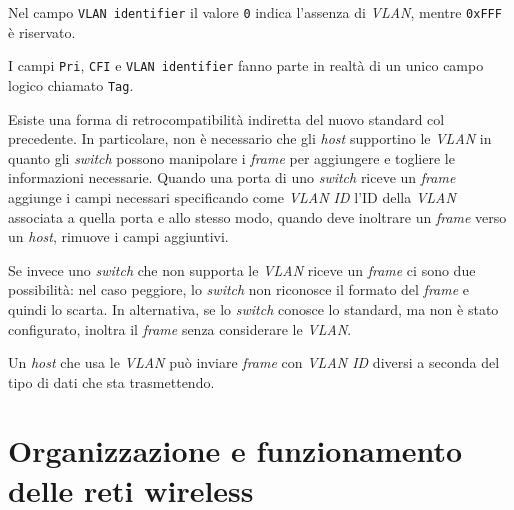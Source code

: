 \begin{note}
    Nel campo \texttt{VLAN identifier} il valore \texttt{0} indica l'assenza di
    \emph{VLAN}, mentre \texttt{0xFFF} è riservato.
\end{note}
\begin{note}
    I campi \texttt{Pri}, \texttt{CFI} e \texttt{VLAN identifier} fanno parte
    in realtà di un unico campo logico chiamato \texttt{Tag}.
\end{note}\noindent
Esiste una forma di retrocompatibilità indiretta del nuovo standard col precedente.
In particolare, non è necessario che gli \emph{host} supportino le
\emph{VLAN}\footnotemark\! in quanto gli \emph{switch} possono manipolare i
\emph{frame} per aggiungere e togliere le informazioni necessarie. Quando una
porta di uno \emph{switch} riceve un \emph{frame}  
aggiunge i campi necessari specificando come \emph{VLAN ID} l'ID della
\emph{VLAN} associata a quella porta e allo stesso modo, quando deve inoltrare
un \emph{frame} verso un \emph{host}, rimuove i campi aggiuntivi.


Se invece uno \emph{switch} che non supporta le \emph{VLAN} riceve un
\emph{frame}  ci sono due possibilità: nel caso peggiore, lo
\emph{switch} non riconosce il formato del \emph{frame} e quindi lo scarta. In
alternativa, se lo \emph{switch} conosce lo standard, ma non è stato configurato,
inoltra il \emph{frame} senza considerare le \emph{VLAN}.

Un \emph{host} che usa le \emph{VLAN} può inviare \emph{frame} con \emph{VLAN
ID} diversi a seconda del tipo di dati che sta trasmettendo.

\section{Organizzazione e funzionamento delle reti wireless}
